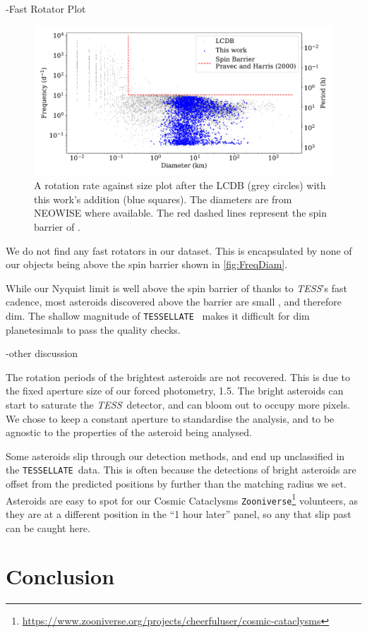 \documentclass[12pt]{article}
\newcommand{\ttt}{\texttt}
\newcommand{\tess}{\textit{TESS}}
\newcommand{\tessellate}{\texttt{TESSELLATE}}
\begin{document}
-Fast Rotator Plot

\begin{figure}
    \centering
    \includegraphics[width=\textwidth]{Diam-FreqPlotThisWorkPaperFigDraft.pdf}
    \caption{A rotation rate against size plot after the LCDB \citep{Warner2009} (grey
circles) with this work's addition (blue squares). The
diameters are from NEOWISE \citep{Masiero2011,NEOWISE2019} where available. The red dashed lines represent the spin barrier of \citep{Pravec2000}.}
    \label{fig:FreqDiam}
\end{figure}


We do not find any fast rotators in our dataset.
This is encapsulated by none of our objects being above the spin barrier shown in \autoref{fig:FreqDiam}.


While our Nyquist limit is well above the spin barrier of \citet{Pravec2000} thanks to \tess's fast cadence, most asteroids discovered above the barrier are small%
, and therefore dim.
The shallow magnitude of \tessellate\ \citep{TESSELLATE} makes it difficult for dim planetesimals to pass the quality checks.


-other discussion

The rotation periods of the brightest asteroids are not recovered.
This is due to the fixed aperture size of our forced photometry, \qty{1.5}{\px}.
The bright asteroids can start to saturate the \tess\ detector, and can bloom out to occupy more pixels.
We chose to keep a constant aperture to standardise the analysis, and to be agnostic to the properties of the asteroid being analysed.

Some asteroids slip through our detection methods, and end up unclassified in the \tessellate\ data.
This is often because the detections of bright asteroids are offset from the predicted positions by further than the matching radius we set.
Asteroids are easy to spot for our Cosmic Cataclysms \ttt{Zooniverse}\footnote{\url{https://www.zooniverse.org/projects/cheerfuluser/cosmic-cataclysms}} volunteers, as they are at a different position in the ``1 hour later'' panel, so any that slip past can be caught here.


\section{Conclusion}\label{sec:Conc}



\end{document}
